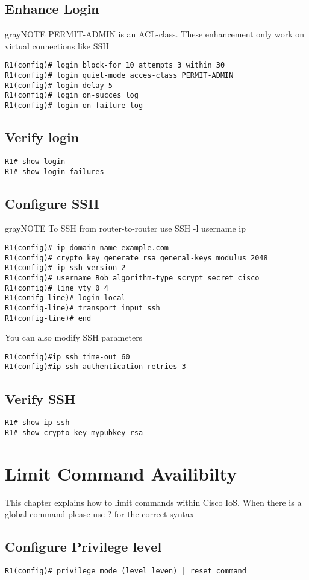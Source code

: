 \subsection{Enhance Login}
\begin{textbox}{gray}{NOTE}
PERMIT-ADMIN is an ACL-class. These enhancement only work on virtual connections like SSH
\end{textbox}
\begin{verbatim}
R1(config)# login block-for 10 attempts 3 within 30
R1(config)# login quiet-mode acces-class PERMIT-ADMIN
R1(config)# login delay 5
R1(config)# login on-succes log
R1(config)# login on-failure log
\end{verbatim}

\subsection{Verify login}
\begin{verbatim}
R1# show login
R1# show login failures
\end{verbatim}

\subsection{Configure SSH }
\begin{textbox}{gray}{NOTE}
To SSH from router-to-router use SSH -l username ip
\end{textbox}
\begin{verbatim}
R1(config)# ip domain-name example.com
R1(config)# crypto key generate rsa general-keys modulus 2048
R1(config)# ip ssh version 2
R1(config)# username Bob algorithm-type scrypt secret cisco
R1(config)# line vty 0 4
R1(conifg-line)# login local
R1(config-line)# transport input ssh
R1(config-line)# end
\end{verbatim}

You can also modify SSH parameters

\begin{verbatim}
R1(config)#ip ssh time-out 60
R1(config)#ip ssh authentication-retries 3
\end{verbatim}

\subsection{Verify SSH}
\begin{verbatim}
R1# show ip ssh
R1# show crypto key mypubkey rsa
\end{verbatim}

\section{Limit Command Availibilty}
This chapter explains how to limit commands within Cisco IoS.
When there is a global command please use ? for the correct syntax

\subsection{Configure Privilege level}
\begin{verbatim}
R1(config)# privilege mode (level leven) | reset command
\end{verbatim}
